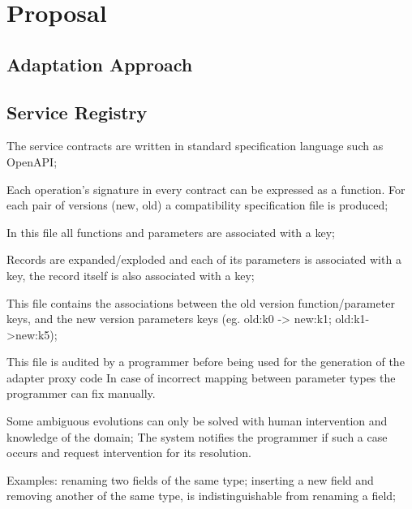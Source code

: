 
%

\chapter{Proposal}
\label{cha:proposal}

\section{Adaptation Approach} %
\label{sec:adaptation_approach}

\section{Service Registry} %
\label{sec:service_registry}

The service contracts are written in standard specification language such as OpenAPI;

Each operation's signature in every contract can be expressed as a function.
For each pair of versions (new, old) a compatibility specification file is produced;

In this file all functions and parameters are associated with a key;

Records are expanded/exploded and each of its parameters is associated with a key, the record itself is also associated with a key;

This file contains the associations between the old version function/parameter keys, and the new version parameters keys (eg. old:k0 -> new:k1; old:k1->new:k5);

This file is audited by a programmer before being used for the generation of the adapter proxy code
In case of incorrect mapping between parameter types the programmer can fix manually.

Some ambiguous evolutions can only be solved with human intervention and knowledge of the domain;
The system notifies the programmer if such a case occurs and request intervention for its resolution.

Examples:
renaming two fields of the same type;
inserting a new field and removing another of the same type, is indistinguishable from renaming a field;


